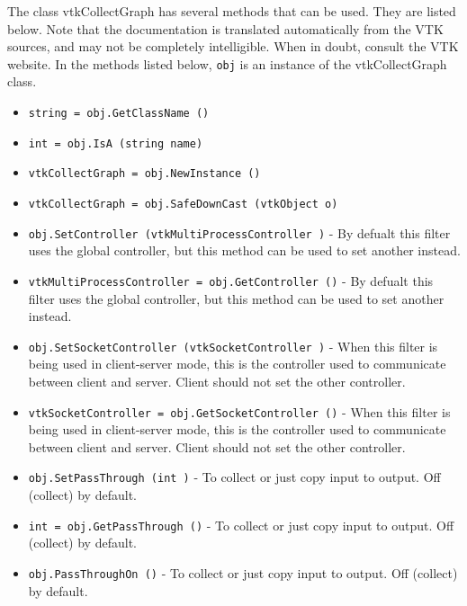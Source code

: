 The class vtkCollectGraph has several methods that can be used.
  They are listed below.
Note that the documentation is translated automatically from the VTK sources,
and may not be completely intelligible.  When in doubt, consult the VTK website.
In the methods listed below, \verb|obj| is an instance of the vtkCollectGraph class.
\begin{itemize}
\item  \verb|string = obj.GetClassName ()|

\item  \verb|int = obj.IsA (string name)|

\item  \verb|vtkCollectGraph = obj.NewInstance ()|

\item  \verb|vtkCollectGraph = obj.SafeDownCast (vtkObject o)|

\item  \verb|obj.SetController (vtkMultiProcessController )| -  By defualt this filter uses the global controller,
 but this method can be used to set another instead.

\item  \verb|vtkMultiProcessController = obj.GetController ()| -  By defualt this filter uses the global controller,
 but this method can be used to set another instead.

\item  \verb|obj.SetSocketController (vtkSocketController )| -  When this filter is being used in client-server mode,
 this is the controller used to communicate between
 client and server.  Client should not set the other controller.

\item  \verb|vtkSocketController = obj.GetSocketController ()| -  When this filter is being used in client-server mode,
 this is the controller used to communicate between
 client and server.  Client should not set the other controller.

\item  \verb|obj.SetPassThrough (int )| -  To collect or just copy input to output. Off (collect) by default.

\item  \verb|int = obj.GetPassThrough ()| -  To collect or just copy input to output. Off (collect) by default.

\item  \verb|obj.PassThroughOn ()| -  To collect or just copy input to output. Off (collect) by default.


\end{itemize}
